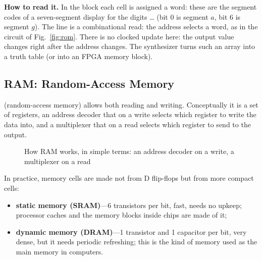 \textbf{How to read it.} In the  block each cell is assigned a word:
these are the segment codes of a seven-segment display for the digits
\ldots{} (bit 0 is segment $a$, bit 6 is segment $g$). The line
 is a combinational read: the address selects a
word, as in the circuit of Fig.~\ref{fig:rom}. There is no clocked update here:
the output value changes right after the address changes. The synthesizer turns
such an array into a truth table (or into an FPGA memory block).

\subsection{RAM: Random-Access Memory}

 (random-access memory) allows both reading and writing.
Conceptually it is a set of registers, an address decoder that on a write
selects which register to write the data into, and a multiplexer that on a
read selects which register to send to the output.

\begin{figure}[H]
\centering
{}
\caption{How RAM works, in simple terms: an address decoder on a write,
a multiplexer on a read}
\label{fig:ram}
\end{figure}

In practice, memory cells are made not from D flip-flops but from more compact
cells:
\begin{itemize}
  \item \textbf{static memory (SRAM)}---6 transistors per bit, fast, needs no
        upkeep; processor caches and the memory blocks inside chips are made
        of it;
  \item \textbf{dynamic memory (DRAM)}---1 transistor and 1 capacitor per
        bit, very dense, but it needs periodic refreshing; this is the kind of
        memory used as the main memory in computers.
\end{itemize}

